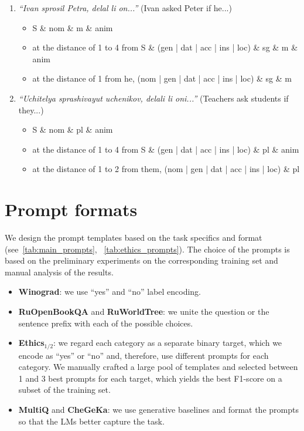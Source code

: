 \documentclass[11pt]{article}
\begin{document}
\begin{itemize}[leftmargin=1em,noitemsep,topsep=0.1pt]
\begin{enumerate}[leftmargin=0.5em,noitemsep,topsep=0.1pt]
        \item \textit{``Ivan sprosil Petra, delal li on...''} (Ivan asked Peter if he...)
        
        \begin{itemize}[noitemsep,topsep=0.1pt]
            \item S \& nom \& m \& anim
            \item at the distance of 1 to 4 from S \& (gen | dat | acc | ins | loc) \& sg \& m \& anim
            \item at the distance of 1 from he, (nom | gen | dat | acc | ins | loc) \& sg \& m
        \end{itemize}
        
        
        \item \textit{``Uchitelya sprashivayut uchenikov, delali li oni...''} (Teachers ask students if they...)
        
        \begin{itemize}[noitemsep,topsep=0.1pt]
            \item S \& nom \& pl \& anim 
            \item at the distance of 1 to 4 from S \& (gen | dat | acc | ins | loc) \& pl \& anim
            \item at the distance of 1 to 2 from them, (nom | gen | dat | acc | ins | loc) \& pl
        \end{itemize}
    \end{enumerate}
\end{itemize}
 

\vfill\eject
\section{Prompt formats}
\label{app:prompt_formats}

We design the prompt templates based on the task specifics and format (see~\autoref{tab:main_prompts}, ~\autoref{tab:ethics_prompts}). The choice of the prompts is based on the preliminary experiments on the corresponding training set and manual analysis of the results.
\begin{itemize}[leftmargin=1em,noitemsep,topsep=0.1pt]
    \item \textbf{Winograd}: we use ``yes'' and ``no'' label encoding.
    \item \textbf{RuOpenBookQA} and \textbf{RuWorldTree}: we unite the question or the sentence prefix with each of the possible choices.
    \item \textbf{Ethics$_{1/2}$}: we regard each category as a separate binary target, which we encode as ``yes'' or ``no'' and, therefore, use different prompts for each category. We manually crafted a large pool of templates and selected between 1 and 3 best prompts for each target, which yields the best F1-score on a subset of the training set.
    \item \textbf{MultiQ} and \textbf{CheGeKa}: we use generative baselines and format the prompts so that the LMs better capture the task.
\end{itemize}
\end{document}
